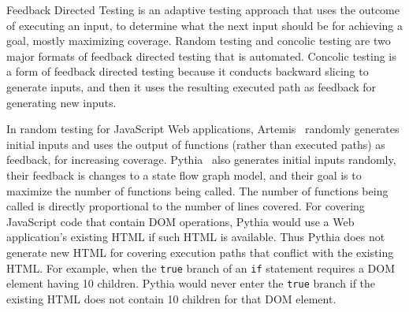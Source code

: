 Feedback Directed Testing is an adaptive testing approach that uses the outcome of executing an input, to determine what the next input should be for achieving a goal, mostly maximizing coverage.  
Random testing and concolic testing are two major formats of feedback directed testing that is automated.  
Concolic testing is a form of feedback directed testing because it conducts backward slicing to generate inputs, and then it uses the resulting executed path as feedback for generating new inputs.  

In random testing for JavaScript Web applications, Artemis~\cite{artemis} randomly generates initial inputs and uses the output of functions (rather than executed paths) as feedback, for increasing coverage.  
Pythia~\cite{pythia} also generates initial inputs randomly, their feedback is changes to a state flow graph model, and their goal is to maximize the number of functions being called.  The number of functions being called is directly proportional to the number of lines covered.  
For covering JavaScript code that contain DOM operations, Pythia would use a Web application's existing HTML if such HTML is available.  Thus Pythia does not generate new HTML for covering execution paths that conflict with the existing HTML.  
For example, when the {\tt true} branch of an {\tt if} statement requires a DOM element having 10 children.  Pythia would never enter the {\tt true} branch if the existing HTML does not contain 10 children for that DOM element.


